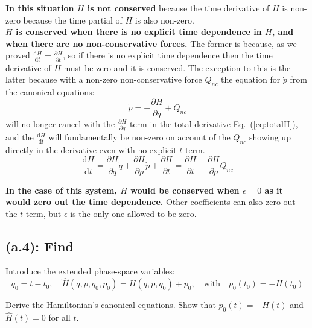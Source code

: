 \documentclass[titlepage]{article}
\begin{document}
\newpage

\begin{mdframed}[linewidth=1pt, innertopmargin=10pt, innerbottommargin=10pt]
	\textbf{In this situation $H$ is not conserved} because the time derivative of $H$ is non-zero because the time partial of $H$ is also non-zero.\\
	
	\textbf{$H$ is conserved when there is no explicit time dependence in $H$, and when there are no non-conservative forces.} The former is because, as we proved $\frac{\mathrm{d}H}{\mathrm{d}t}=\frac{\partial H}{\partial t}$, so if there is no explicit time dependence then the time derivative of $H$ must be zero and it is conserved. The exception to this is the latter because with a non-zero non-conservative force $Q_{nc}$ the equation for $\dot{p}$ from the canonical equations:
	\begin{equation}
		\dot{p}=-\frac{\partial H}{\partial q}+Q_{nc}
	\end{equation}
	will no longer cancel with the $\frac{\partial H}{\partial q}$ term in the total derivative Eq.~(\ref{eq:totalH}), and the $\frac{\mathrm{d}H}{\mathrm{d}t}$ will fundamentally be non-zero on account of the $Q_{nc}$ showing up directly in the derivative even with no explicit $t$ term.
	\begin{equation}
		\frac{\mathrm{d}H}{\mathrm{d}t}=\frac{\partial H}{\partial q}\dot{q}+\frac{\partial H}{\partial p}\dot{p}+\frac{\partial H}{\partial t}=\frac{\partial H}{\partial t}+\frac{\partial H}{\partial p}Q_{nc}
	\end{equation}
	
	\textbf{In the case of this system, $H$ would be conserved when $\epsilon=0$ as it would zero out the time dependence.} Other coefficients can also zero out the $t$ term, but $\epsilon$ is the only one allowed to be zero.
\end{mdframed}

\subsection*{(a.4): Find}

Introduce the extended phase-space variables:
\begin{equation}
	q_0=t-t_0,\quad\hat{H}(q,p,q_0,p_0)=H(q,p,q_0)+p_0,\quad\text{with}\quad p_0(t_0)=-H(t_0)
\end{equation}

Derive the Hamiltonian's canonical equations. Show that $p_0(t)=-H(t)$ and $\hat{H}(t)=0$ for all $t$.\\
\end{document}
